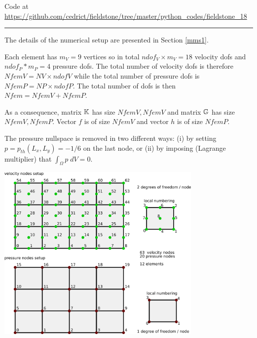 

\begin{center}
Code at \url{https://github.com/cedrict/fieldstone/tree/master/python_codes/fieldstone_18}
\end{center}

\par\noindent\rule{\textwidth}{0.4pt}

The details of the numerical setup are presented in Section \ref{mms1}.

Each element has $m_V=9$ vertices so in total $ndof_V\times m_V=18$ velocity dofs and 
$ndof_P*m_P=4$ pressure dofs. The total number of 
velocity dofs is therefore $NfemV=NV \times ndofV$ while the total number of
pressure dofs is $NfemP=NP\times ndofP$. The total number of dofs is then $Nfem=NfemV+NfemP$.

As a consequence, matrix ${\mathbb{K}}$ has size $NfemV,NfemV$ and matrix ${\mathbb{G}}$ has size $NfemV,NfemP$.
Vector $f$ is of size $NfemV$ and vector $h$ is of size $NfemP$.  

The pressure nullspace is removed in two different ways:
(i) by setting $p=p_{th}(L_x,L_y)=-1/6$ on the last node, or (ii)
by imposing (Lagrange multiplier) that $\int_\Omega p \; dV=0$.

\begin{center}
\includegraphics[width=10cm]{python_codes/fieldstone_18/images/q2q1setup}
\end{center}

